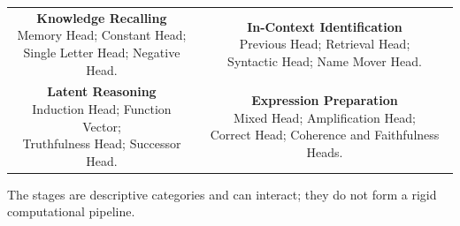 \begin{center}
\setlength{\fboxsep}{5pt}
\renewcommand{\arraystretch}{1.2}
\begin{tabular}{cc}
    \fbox{\parbox[t][1.65cm][t]{0.42\textwidth}{\centering
        \textbf{Knowledge Recalling}\\[0.2em]
        \footnotesize Memory Head; Constant Head;\\
        Single Letter Head; Negative Head.}} &
    \fbox{\parbox[t][1.65cm][t]{0.42\textwidth}{\centering
        \textbf{In-Context Identification}\\[0.2em]
        \footnotesize Previous Head; Retrieval Head;\\
        Syntactic Head; Name Mover Head.}}\\[0.35em]
    \fbox{\parbox[t][1.65cm][t]{0.42\textwidth}{\centering
        \textbf{Latent Reasoning}\\[0.2em]
        \footnotesize Induction Head; Function Vector;\\
        Truthfulness Head; Successor Head.}} &
    \fbox{\parbox[t][1.65cm][t]{0.42\textwidth}{\centering
        \textbf{Expression Preparation}\\[0.2em]
        \footnotesize Mixed Head; Amplification Head;\\
        Correct Head; Coherence and Faithfulness Heads.}}
\end{tabular}

\par\smallskip
\footnotesize
The stages are descriptive categories and can interact; they do not form
a rigid computational pipeline.
\normalsize
\end{center}
